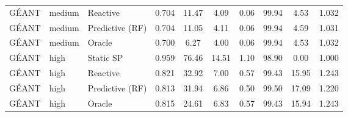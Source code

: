 \begin{table}[t]
\begin{tabular}{@{}lllccccccc@{}}
G\'EANT & medium & Reactive & 0.704 & 11.47 & 4.09 & 0.06 & 99.94 & 4.53 & 1.032 \\
G\'EANT & medium & Predictive (RF) & 0.704 & 11.05 & 4.11 & 0.06 & 99.94 & 4.59 & 1.031 \\
G\'EANT & medium & Oracle & 0.700 & 6.27 & 4.00 & 0.06 & 99.94 & 4.53 & 1.032 \\
G\'EANT & high & Static SP & 0.959 & 76.46 & 14.51 & 1.10 & 98.90 & 0.00 & 1.000 \\
G\'EANT & high & Reactive & 0.821 & 32.92 & 7.00 & 0.57 & 99.43 & 15.95 & 1.243 \\
G\'EANT & high & Predictive (RF) & 0.813 & 31.94 & 6.86 & 0.50 & 99.50 & 17.09 & 1.220 \\
G\'EANT & high & Oracle & 0.815 & 24.61 & 6.83 & 0.57 & 99.43 & 15.94 & 1.243 \\
\bottomrule
\end{tabular}
\end{table}

